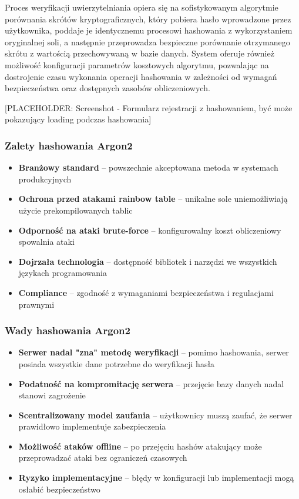 \documentclass{article}
\begin{document}
Proces weryfikacji uwierzytelniania opiera się na sofistykowanym algorytmie porównania skrótów kryptograficznych, który pobiera hasło wprowadzone przez użytkownika, poddaje je identycznemu procesowi hashowania z wykorzystaniem oryginalnej soli, a następnie przeprowadza bezpieczne porównanie otrzymanego skrótu z wartością przechowywaną w bazie danych. System oferuje również możliwość konfiguracji parametrów kosztowych algorytmu, pozwalając na dostrojenie czasu wykonania operacji hashowania w zależności od wymagań bezpieczeństwa oraz dostępnych zasobów obliczeniowych.

[PLACEHOLDER: Screenshot - Formularz rejestracji z hashowaniem, być może pokazujący loading podczas hashowania]

\subsubsection{Zalety hashowania Argon2}
\begin{itemize}
    \item \textbf{Branżowy standard} – powszechnie akceptowana metoda w systemach produkcyjnych
    \item \textbf{Ochrona przed atakami rainbow table} – unikalne sole uniemożliwiają użycie prekompilowanych tablic
    \item \textbf{Odporność na ataki brute-force} – konfigurowalny koszt obliczeniowy spowalnia ataki
    \item \textbf{Dojrzała technologia} – dostępność bibliotek i narzędzi we wszystkich językach programowania
    \item \textbf{Compliance} – zgodność z wymaganiami bezpieczeństwa i regulacjami prawnymi
\end{itemize}

\subsubsection{Wady hashowania Argon2}
\begin{itemize}
    \item \textbf{Serwer nadal "zna" metodę weryfikacji} – pomimo hashowania, serwer posiada wszystkie dane potrzebne do weryfikacji hasła
    \item \textbf{Podatność na kompromitację serwera} – przejęcie bazy danych nadal stanowi zagrożenie
    \item \textbf{Scentralizowany model zaufania} – użytkownicy muszą zaufać, że serwer prawidłowo implementuje zabezpieczenia
    \item \textbf{Możliwość ataków offline} – po przejęciu hashów atakujący może przeprowadzać ataki bez ograniczeń czasowych
    \item \textbf{Ryzyko implementacyjne} – błędy w konfiguracji lub implementacji mogą osłabić bezpieczeństwo
\end{itemize}
\end{document}
